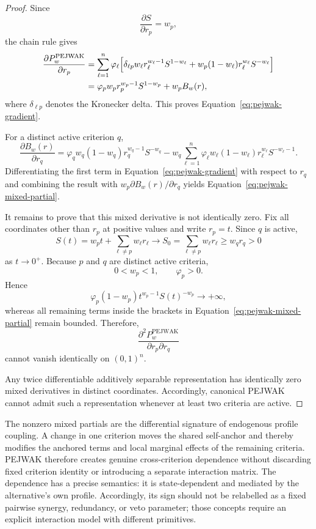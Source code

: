 \documentclass[reqno,11pt]{amsart}
\theoremstyle{definition}
\theoremstyle{plain}
\theoremstyle{remark}
\begin{document}
\begin{proof}
Since
\[
\frac{\partial S}{\partial r_p}=w_p,
\]
the chain rule gives
\[
\begin{aligned}
\frac{\partial P_w^{\mathrm{PEJWAK}}}{\partial r_p}
&=
\sum_{\ell=1}^{n}\varphi_\ell
\Bigl[
\delta_{\ell p}w_\ell
r_\ell^{w_\ell-1}S^{1-w_\ell}
+
w_p(1-w_\ell)
r_\ell^{w_\ell}S^{-w_\ell}
\Bigr]\\
&=
\varphi_pw_pr_p^{w_p-1}S^{1-w_p}
+
w_pB_w(r),
\end{aligned}
\]
where $\delta_{\ell p}$ denotes the Kronecker delta. This proves
Equation~\eqref{eq:pejwak-gradient}.

For a distinct active criterion $q$,
\[
\frac{\partial B_w(r)}{\partial r_q}
=
\varphi_qw_q(1-w_q)
r_q^{w_q-1}S^{-w_q}
-
w_q
\sum_{\ell=1}^{n}
\varphi_\ell w_\ell(1-w_\ell)
r_\ell^{w_\ell}S^{-w_\ell-1}.
\]
Differentiating the first term in
Equation~\eqref{eq:pejwak-gradient} with respect to $r_q$ and combining
the result with $w_p\partial B_w(r)/\partial r_q$ yields
Equation~\eqref{eq:pejwak-mixed-partial}.

It remains to prove that this mixed derivative is not identically zero.
Fix all coordinates other than $r_p$ at positive values and write
$r_p=t$. Since $q$ is active,
\[
S(t)
=
w_pt+\sum_{\ell\neq p}w_\ell r_\ell
\longrightarrow
S_0
=
\sum_{\ell\neq p}w_\ell r_\ell
\geq
w_qr_q
>
0
\]
as $t\to0^+$. Because $p$ and $q$ are distinct active criteria,
\[
0<w_p<1,
\qquad
\varphi_p>0.
\]
Hence
\[
\varphi_p(1-w_p)
t^{w_p-1}S(t)^{-w_p}
\longrightarrow
+\infty,
\]
whereas all remaining terms inside the brackets in
Equation~\eqref{eq:pejwak-mixed-partial} remain bounded. Therefore,
\[
\frac{\partial^2P_w^{\mathrm{PEJWAK}}}
{\partial r_p\partial r_q}
\]
cannot vanish identically on $(0,1)^n$.

Any twice differentiable additively separable representation has
identically zero mixed derivatives in distinct coordinates.
Accordingly, canonical PEJWAK cannot admit such a representation
whenever at least two criteria are active.
\end{proof}

The nonzero mixed partials are the differential signature of endogenous
profile coupling. A change in one criterion moves the shared self-anchor
and thereby modifies the anchored terms and local marginal effects of the
remaining criteria. PEJWAK therefore creates genuine cross-criterion
dependence without discarding fixed criterion identity or introducing a
separate interaction matrix. The dependence has a precise semantics: it
is state-dependent and mediated by the alternative's own profile.
Accordingly, its sign should not be relabelled as a fixed pairwise
synergy, redundancy, or veto parameter; those concepts require an
explicit interaction model with different primitives.
\end{document}
